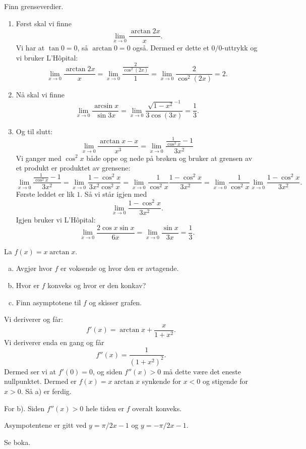 \documentclass[11pt, norsk]{article}
\begin{document}
\begin{oppg}
  Finn grenseverdier.
\end{oppg}

\begin{losn}
  \begin{enumerate}
  \item Først skal vi finne
$$
\lim_{x \to 0} \frac{\arctan 2x}{x}.
$$
Vi har at $\tan 0 = 0$, så $\arctan 0=0$ også. Dermed er dette et $0/0$-uttrykk og vi bruker L'Hôpital:
$$
\lim_{x \to 0} \frac{\arctan 2x}{x} = \lim_{x \to 0} \frac{\frac{2}{\cos^2(2x)}}{1} = \lim_{x \to 0} \frac{2}{\cos^2(2x)} = 2.
$$
\item

Nå skal vi finne 
$$
\lim_{x \to 0} \frac{\arcsin x}{\sin 3x} = \lim_{x \to 0} \frac{\sqrt{1-x^2}^{-1}}{3\cos (3x)} = \frac{1}{3}.
$$
\item Og til slutt:
$$
\lim_{x \to 0} \frac{\arctan x - x}{x^3} = \lim_{x \to 0} \frac{\frac{1}{\cos^2 x} - 1}{3x^2}
$$
Vi ganger med $\cos^2 x$ både oppe og nede på brøken og bruker at grensen av et produkt er produktet av grensene:
$$
\lim_{x \to 0} \frac{\frac{1}{\cos^2 x} - 1}{3x^2} = \lim_{x \to 0} \frac{1-\cos^2 x}{3x^2 \cos^2 x} = \lim_{x \to 0} \frac{1}{\cos^2 x} \frac{1- \cos^2 x}{3x^2} = \lim_{x \to 0} \frac{1}{\cos^2 x} \lim_{x \to 0} \frac{1-\cos^2 x}{3x^2}.
$$
Første leddet er lik $1$. Så vi står igjen med 
$$
\lim_{x \to 0} \frac{1-\cos^2 x}{3x^2}.
$$
Igjen bruker vi L'Hôpital:
$$
\lim_{x \to 0} \frac{2 \cos x  \sin x}{6x} = \lim_{x \to 0} \frac{\sin x}{3 x} = \frac 13.
$$
  \end{enumerate}
\end{losn}

\begin{oppg}
  La $f(x) = x \arctan x$. 
  \begin{enumerate}[a)]
  \item Avgjør hvor $f$ er voksende og hvor den er avtagende. 
\item Hvor er $f$ konveks og hvor er den konkav?
\item Finn asymptotene til $f$ og skisser grafen. 
  \end{enumerate}
\end{oppg}

\begin{sol}
Vi deriverer og får:
$$
f'(x) = \arctan x + \frac{x}{1+x^2}.
$$
Vi deriverer enda en gang og får
$$
f''(x) = \frac{1}{(1+x^2)^2}.
$$
Dermed ser vi at $f'(0)=0$, og siden $f''(x) > 0$ må dette være det eneste nullpunktet. Dermed er $f(x)=x \arctan x$ synkende for $x < 0$ og stigende for $x > 0$.  Så a) er ferdig.

For b). Siden $f''(x) > 0$ hele tiden er $f$ overalt konveks.

Asympotentene er gitt ved $y=\pi/2 x - 1$ og $y=-\pi / 2 x -1$.
\end{sol}

\begin{oppg}
 Se boka.
\end{oppg}
\end{document}
